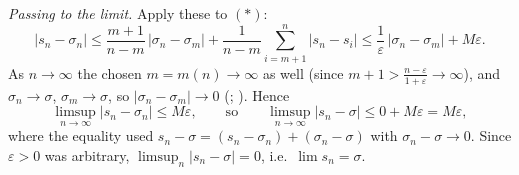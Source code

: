 \documentclass[main.tex]{subfiles}
\begin{document}
\begin{SolutionBlue}
\emph{Passing to the limit.} Apply these to $(\ast)$:
\[
|s_{n}-\sigma_{n}|\le\frac{m+1}{n-m}\,|\sigma_{n}-\sigma_{m}|+\frac{1}{n-m}\sum_{i=m+1}^{n}|s_{n}-s_{i}|
   \le\frac{1}{\varepsilon}\,|\sigma_{n}-\sigma_{m}|+M\varepsilon .
\]
As $n\to\infty$ the chosen $m=m(n)\to\infty$ as well (since $m+1>\frac{n-\varepsilon}{1+\varepsilon}\to\infty$),
and $\sigma_{n}\to\sigma$, $\sigma_{m}\to\sigma$, so $|\sigma_{n}-\sigma_{m}|\to 0$
(; ). Hence
\[
\limsup_{n\to\infty}|s_{n}-\sigma_{n}|\le M\varepsilon,
\qquad\text{so}\qquad \limsup_{n\to\infty}|s_{n}-\sigma|\le 0+M\varepsilon=M\varepsilon,
\]
where the equality used $s_{n}-\sigma=(s_{n}-\sigma_{n})+(\sigma_{n}-\sigma)$ with $\sigma_{n}-\sigma\to 0$.
Since $\varepsilon>0$ was arbitrary, $\limsup_{n}|s_{n}-\sigma|=0$, i.e.\ $\lim s_{n}=\sigma$.
\end{SolutionBlue}
\end{document}
